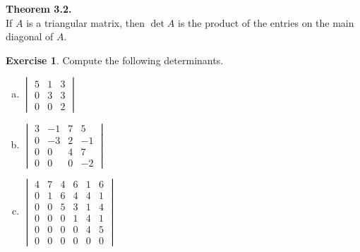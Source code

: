 \documentclass[10pt]{book}
\newcommand{\Rand}{\pgfmathparse{random(7)}\pgfmathresult}
\newcommand{\boxcolor}{gray!30}
\newenvironment{boxthm}{\begin{mdframed}[backgroundcolor=\boxcolor,nobreak=true]}{\end{mdframed}}
\theoremstyle{definition}
\newtheorem{exercise}{Exercise}[section]
\begin{document}
\begin{boxthm}
	\textbf{Theorem 3.2.} \\
	If $A$ is a triangular matrix, then $\det A$ is the product of the entries on the main diagonal of $A$.
\end{boxthm}
\begin{exercise} %
	Compute the following determinants.
	\begin{multicols}{3}
	\begin{enumerate}[(a)]
		\item
			$\begin{vmatrix}
			5&1&3\\
			0&3&3\\
			0&0&2
			\end{vmatrix}$
		\item 
			$\begin{vmatrix}
			3&-1&7& 5\\
			0&-3&2&-1\\
			0& 0&4& 7\\
			0& 0&0&-2
			\end{vmatrix}$
		\item
			$\begin{vmatrix}
			4&7&4&6&1&6\\
			0&1&6&4&4&1\\
			0&0&5&3&1&4\\
			0&0&0&1&4&1\\
			0&0&0&0&4&5\\
			0&0&0&0&0&0
			\end{vmatrix}$
	\end{enumerate}
	\end{multicols}
\end{exercise}
\vspace{1in}
\end{document}
